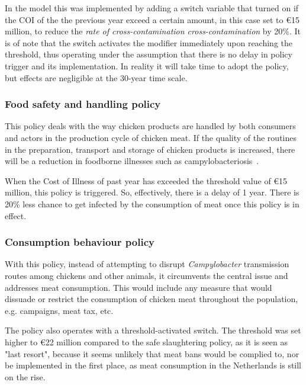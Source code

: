 In the model this was implemented by adding a switch variable that turned on if the COI of the the previous year exceed a certain amount, in this case set to \euro 15 million, to reduce the \textit{rate of cross-contamination cross-contamination} by 20\%. It is of note that the switch activates the modifier immediately upon reaching the threshold, thus operating under the assumption that there is no delay in policy trigger and its implementation. In reality it will take time to adopt the policy, but effects are negligible at the 30-year time scale.

\subsubsection{Food safety and handling policy}
This policy deals with the way chicken products are handled by both consumers and actors in the production cycle of chicken meat. If the quality of the routines in the preparation, transport and storage of chicken  products is increased, there will be a reduction in foodborne illnesses such as campylobacteriosis~\parencite{shane_campylobacter_2000}.

When the Cost of Illness of past year has exceeded the threshold value of \euro 15 million, this policy is triggered. So, effectively, there is a delay of 1 year. There is 20\% less chance to get infected by the consumption of meat once this policy is in effect.

\subsubsection{Consumption behaviour policy}
With this policy, instead of attempting to disrupt \textit{Campylobacter} transmission routes among chickens and other animals, it circumvents the central issue and addresses meat consumption. This would include any measure that would dissuade or restrict the consumption of chicken meat throughout the population, e.g. campaigns, meat tax, etc.

The policy also operates with a threshold-activated switch. The threshold was set higher to \euro 22 million compared to the safe slaughtering policy, as it is seen as "last resort", because it seems unlikely that meat bans would be complied to, nor be implemented in the first place, as meat consumption in the Netherlands is still on the rise.

